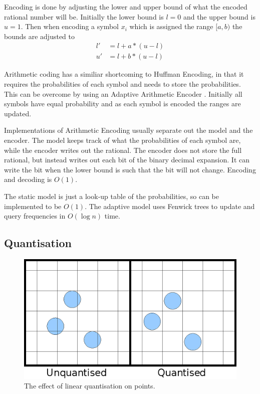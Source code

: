 \documentclass[a4paper]{report}
\begin{document}
Encoding is done by adjusting the lower and upper bound of what the encoded
rational number will be. Initially the lower bound is $l=0$ and the upper
bound is $u=1$. Then when encoding a symbol $x_i$ which is assigned the range
$[a,b)$ the bounds are adjusted to
\begin{align*}
  l' & = l + a * (u-l) \\
  u' & = l + b * (u-l)
\end{align*}

Arithmetic coding has a similiar shortcoming to Huffman Encoding, in that it
requires the probabilities of each symbol and needs to store the
probabilities. This can be overcome by using an Adaptive Arithmetic Encoder
\citep{drozdek}. Initially all symbols have equal probability and as each
symbol is encoded the ranges are updated.

Implementations of Arithmetic Encoding usually separate out the model and the
encoder. The model keeps track of what the probabilities of each symbol are,
while the encoder writes out the rational. The encoder does not store the full
rational, but instead writes out each bit of the binary decimal expansion. It
can write the bit when the lower bound is such that the bit will not
change. Encoding and decoding is $O(1)$.

The static model is just a look-up table of the probabilities, so can be
implemented to be $O(1)$. The adaptive model uses Fenwick trees
\citep{fenwick1994new} to update and query frequencies in $O(\log n)$ time.


\subsection{Quantisation}

\begin{figure}
  \centering
  \includegraphics[width=\textwidth]{images/quantisation}
  \caption{The effect of linear quantisation on points.}
  \label{fig:quant}
\end{figure}
\end{document}
